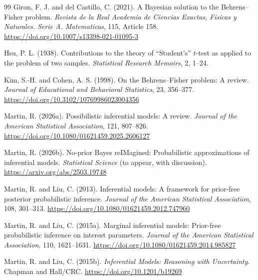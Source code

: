 \documentclass[12pt]{article}
\begin{document}
\begin{thebibliography}{99}
Giron, F. J. and del Castillo, C. (2021).
A Bayesian solution to the Behrens--Fisher problem.
\emph{Revista de la Real Academia de Ciencias Exactas, Fisicas y Naturales.
Serie A. Matematicas}, 115, Article 158.
\newblock \href{https://doi.org/10.1007/s13398-021-01095-3}{https://doi.org/10.1007/s13398-021-01095-3}

Hsu, P. L. (1938).
Contributions to the theory of ``Student's'' \(t\)-test as applied to the
problem of two samples.
\emph{Statistical Research Memoirs}, 2, 1--24.

Kim, S.-H. and Cohen, A. S. (1998).
On the Behrens--Fisher problem: A review.
\emph{Journal of Educational and Behavioral Statistics}, 23, 356--377.
\newblock \href{https://doi.org/10.3102/10769986023004356}{https://doi.org/10.3102/10769986023004356}

Martin, R. (2026a).
Possibilistic inferential models: A review.
\emph{Journal of the American Statistical Association}, 121, 807--826.
\newblock \href{https://doi.org/10.1080/01621459.2025.2606127}{https://doi.org/10.1080/01621459.2025.2606127}

Martin, R. (2026b).
No-prior Bayes reIMagined: Probabilistic approximations of inferential models.
\emph{Statistical Science} (to appear, with discussion).
\newblock \href{https://arxiv.org/abs/2503.19748}{https://arxiv.org/abs/2503.19748}

Martin, R. and Liu, C. (2013).
Inferential models: A framework for prior-free posterior probabilistic
inference.
\emph{Journal of the American Statistical Association}, 108, 301--313.
\newblock \href{https://doi.org/10.1080/01621459.2012.747960}{https://doi.org/10.1080/01621459.2012.747960}

Martin, R. and Liu, C. (2015a).
Marginal inferential models: Prior-free probabilistic inference on interest
parameters.
\emph{Journal of the American Statistical Association}, 110, 1621--1631.
\newblock \href{https://doi.org/10.1080/01621459.2014.985827}{https://doi.org/10.1080/01621459.2014.985827}

Martin, R. and Liu, C. (2015b).
\emph{Inferential Models: Reasoning with Uncertainty}.
Chapman and Hall/CRC.
\newblock \href{https://doi.org/10.1201/b19269}{https://doi.org/10.1201/b19269}


\end{thebibliography}
\end{document}

